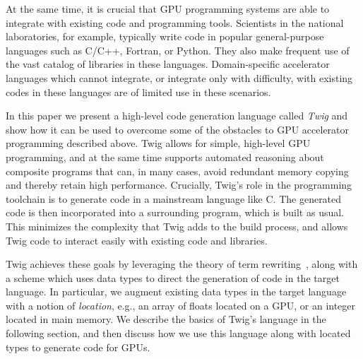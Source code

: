 At the same time, it is crucial that GPU programming systems are able
to integrate with existing code and programming tools. Scientists in
the national laboratories, for example, typically write code in
popular general-purpose languages such as C/C++, Fortran, or
Python. They also make frequent use of the vast catalog of libraries
in these languages. Domain-specific accelerator languages which cannot
integrate, or integrate only with difficulty, with existing codes in
these languages are of limited use in these scenarios.

In this paper we present a high-level code generation language called
\emph{Twig} and show how it can be used to overcome some of the obstacles to GPU
accelerator programming described above. Twig allows for simple, high-level GPU
programming, and at the same time supports automated reasoning about composite
programs that can, in many cases, avoid redundant memory copying and thereby
retain high performance. Crucially, Twig's role in the programming toolchain is
to generate code in a mainstream language like C. The generated code is then
incorporated into a surrounding program, which is built as usual. This minimizes
the complexity that Twig adds to the build process, and allows Twig code to
interact easily with existing code and libraries.

Twig achieves these goals by leveraging the theory of term
rewriting~\cite{baader98rewriting}, along with a scheme which uses data types to
direct the generation of code in the target language. In particular, we augment
existing data types in the target language with a notion of \emph{location},
e.g., an array of floats located on a GPU, or an integer located in main memory.
We describe the basics of Twig's language in the following section, and then
discuss how we use this language along with located types to generate code for
GPUs.


